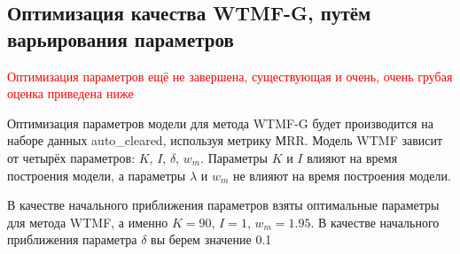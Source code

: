 \subsection{Оптимизация качества WTMF-G, путём варьирования параметров}
    \textcolor{red}{Оптимизация параметров ещё не завершена, существующая и очень, очень грубая оценка приведена ниже}

    Оптимизация параметров модели для метода WTMF-G будет производится на наборе данных auto\_cleared, используя метрику МRR.
    Модель WTMF зависит от четырёх параметров: $K$, $I$, $\delta$, $w_m$.
    Параметры $K$ и $I$ влияют на время построения модели, а параметры $\lambda$ и $w_m$ не влияют на время построения модели.

    В качестве начального приближения параметров взяты оптимальные параметры для метода WTMF, а именно $K=90$, $I=1$, $w_m=1.95$.
    В качестве начального приближения параметра $\delta$ вы берем значение 0.1


